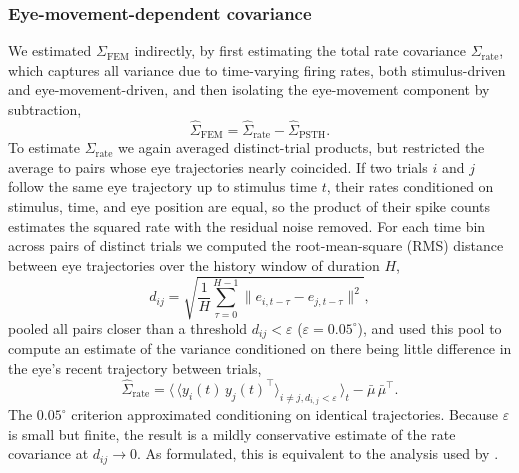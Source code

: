 \documentclass{lite}
\newcommand{\Cfem}{\Sigma_{\text{FEM}}}
\newcommand{\Crate}{\Sigma_{\text{rate}}}
\begin{document}
\subsubsection{Eye-movement-dependent covariance}
We estimated $\Cfem$ indirectly, by first estimating the total rate covariance $\Crate$, which captures all variance due to time-varying firing rates, both stimulus-driven and eye-movement-driven, and then isolating the eye-movement component by subtraction,
\begin{equation}
    \hat{\Sigma}_{\text{FEM}} = \hat{\Sigma}_{\text{rate}} - \hat{\Sigma}_{\text{PSTH}}.
\end{equation}
To estimate $\Crate$ we again averaged distinct-trial products, but restricted the average to pairs whose eye trajectories nearly coincided. If two trials $i$ and $j$ follow the same eye trajectory up to stimulus time $t$, their rates conditioned on stimulus, time, and eye position are equal, so the product of their spike counts estimates the squared rate with the residual noise removed. For each time bin across pairs of distinct trials we computed the root-mean-square (RMS) distance between eye trajectories over the history window of duration $H$,
\begin{equation}
    d_{ij} = \sqrt{\frac{1}{H} \sum_{\tau=0}^{H-1} \|e_{i,t-\tau} - e_{j,t-\tau}\|^2},
\end{equation}
pooled all pairs closer than a threshold $d_{ij} < \varepsilon$ ($\varepsilon = 0.05^\circ$), and used this pool to compute an estimate of the variance conditioned on there being little difference in the eye's recent trajectory between trials,
\begin{equation}
    \hat{\Sigma}_{\text{rate}} = \big\langle\, \langle y_{i}(t)\, y_{j}(t)^\top \rangle_{i \neq j, d_{i,j} < \varepsilon} \,\big\rangle_{t} - \bar{\mu}\,\bar{\mu}^\top.
\end{equation}
The $0.05^\circ$ criterion approximated conditioning on identical trajectories. Because $\varepsilon$ is small but finite, the result is a mildly conservative estimate of the rate covariance at $d_{ij} \to 0$. As formulated, this is equivalent to the analysis used by \cite{mcfarland2016variability}.
\end{document}
